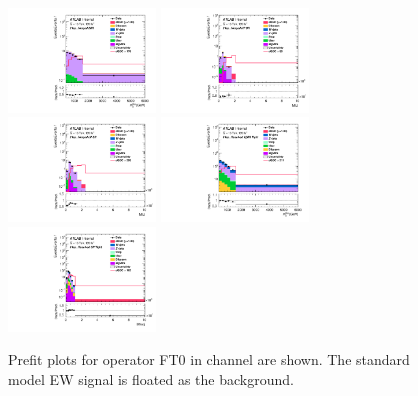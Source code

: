 \begin{figure}[ht]
    \centering
    	\includegraphics[width=0.35\textwidth]{figures/aQGC/Region_distMTagMerJets_DCRVjet_BMin0_J0_incJet1_L2_T0_incFat1_Y6051_incTag1_Fat1_Prefitlog.pdf}
    	\includegraphics[width=0.35\textwidth]{figures/aQGC/Region_distMllJ_DSRVBSHP_BMin0_J0_incJet1_L2_T0_incFat1_Y6051_incTag1_Fat1_Prefitlog.pdf}
    	\includegraphics[width=0.35\textwidth]{figures/aQGC/Region_distMllJ_DSRVBSLP_BMin0_J0_incJet1_L2_T0_incFat1_Y6051_incTag1_Fat1_Prefitlog.pdf}
    	\includegraphics[width=0.35\textwidth]{figures/aQGC/Region_distMTagJets_DCRVjetFid_BMin0_T0_Y6051_incTag1_J2_L0_incJet1_Prefitlog.pdf}
    	\includegraphics[width=0.35\textwidth]{figures/aQGC/Region_distMtvvjj_DSRVBSFid_BMin0_T0_Y6051_incTag1_J2_L0_incJet1_Prefitlog.pdf}
        \caption{Prefit plots for operator FT0 in \tlep channel are shown. The standard model EW signal is floated as the background.}
        \label{fig:2lepFT0}
\end{figure}

